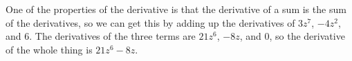 One of the properties of the derivative is that the derivative of a sum is the sum of the derivatives,
so we can get this by adding up the derivatives of $3z^7$, $-4z^2$, and 6. The derivatives of the
three terms are $21z^6$, $-8z$, and 0, so the derivative of the whole thing is $21z^6-8z$.
